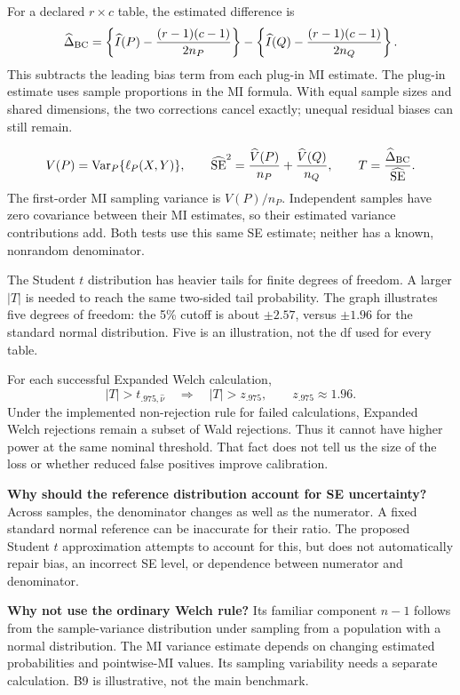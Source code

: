 For a declared \(r\times c\) table, the estimated difference is
\[
\widehat\Delta_{\mathrm{BC}}=
\left\{\widehat I(P)-\frac{(r-1)(c-1)}{2n_P}\right\}
-\left\{\widehat I(Q)-\frac{(r-1)(c-1)}{2n_Q}\right\}.
\]
This subtracts the leading bias term from each plug-in MI estimate. The plug-in estimate uses sample proportions in the MI formula. With equal sample sizes and shared dimensions, the two corrections cancel exactly; unequal residual biases can still remain.

\[
V(P)=\operatorname{Var}_P\{\ell_P(X,Y)\},\qquad
\widehat{\mathrm{SE}}^2=\frac{\widehat V(P)}{n_P}+\frac{\widehat V(Q)}{n_Q},\qquad
T=\frac{\widehat\Delta_{\mathrm{BC}}}{\widehat{\mathrm{SE}}}.
\]
The first-order MI sampling variance is \(V(P)/n_P\). Independent samples have zero covariance between their MI estimates, so their estimated variance contributions add. Both tests use this same SE estimate; neither has a known, nonrandom denominator.

The Student \(t\) distribution has heavier tails for finite degrees of freedom. A larger \(|T|\) is needed to reach the same two-sided tail probability. The graph illustrates five degrees of freedom: the 5\% cutoff is about \(\pm2.57\), versus \(\pm1.96\) for the standard normal distribution. Five is an illustration, not the df used for every table.

For each successful Expanded Welch calculation,
\[
|T|>t_{.975,\widehat\nu}\quad\Longrightarrow\quad |T|>z_{.975},
\qquad z_{.975}\approx1.96.
\]
Under the implemented non-rejection rule for failed calculations, Expanded Welch rejections remain a subset of Wald rejections. Thus it cannot have higher power at the same nominal threshold. That fact does not tell us the size of the loss or whether reduced false positives improve calibration.

\textbf{Why should the reference distribution account for SE uncertainty?} Across samples, the denominator changes as well as the numerator. A fixed standard normal reference can be inaccurate for their ratio. The proposed Student \(t\) approximation attempts to account for this, but does not automatically repair bias, an incorrect SE level, or dependence between numerator and denominator.

\textbf{Why not use the ordinary Welch rule?} Its familiar component \(n-1\) follows from the sample-variance distribution under sampling from a population with a normal distribution. The MI variance estimate depends on changing estimated probabilities and pointwise-MI values. Its sampling variability needs a separate calculation. B9 is illustrative, not the main benchmark.

